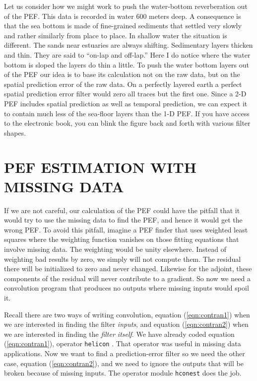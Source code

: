 
\par
Let us consider how we might work
to push the water-bottom reverberation out of the PEF.
This data is recorded in water 600 meters deep.
A consequence is that the sea bottom is made of fine-grained sediments
that settled very slowly and rather similarly from place to place.
In shallow water the situation is different.
The sands near estuaries are always shifting.
Sedimentary layers thicken and thin.
They are said to ``on-lap and off-lap.''
Here I do notice where the water bottom is sloped
the layers do thin a little.
To push the water bottom layers out of the PEF
our idea is to base its calculation not on the raw data,
but on the spatial prediction error of the raw data.
On a perfectly layered earth
a perfect spatial prediction error filter would zero all traces
but the first one.
Since a 2-D PEF includes spatial prediction as well as temporal
prediction, we can expect it to contain much less of the sea-floor
layers than the 1-D PEF.
If you have access to the electronic book, you can blink
the figure back and forth with various filter shapes.





\section{PEF ESTIMATION WITH MISSING DATA}
\par
If we are not careful,
our calculation of the PEF
could have the pitfall that it would try to use the missing
data to find the PEF, and hence it would get the wrong PEF.
To avoid this pitfall,
imagine a PEF finder that uses weighted least squares
where the weighting function vanishes on
those fitting equations that involve missing data.
The weighting would be unity elsewhere.
Instead of weighting bad results by zero,
we simply will not compute them.
The residual there will be initialized to zero and
never changed.
Likewise for the adjoint,
these components of the residual will never contribute to a gradient.
So now we need a convolution program that
produces no outputs where missing inputs would spoil it.

\par
Recall there are two ways of writing convolution,
equation (\ref{eqn:contran1})
when we are interested in finding the filter
{\em inputs}, and
equation (\ref{eqn:contran2})
when we are interested in finding the
{\em filter itself}.
We have already coded
equation (\ref{eqn:contran1}),
operator
\texttt{helicon} .
That operator was useful in missing data applications.
Now we want to find a prediction-error filter
so we need the other case,
equation (\ref{eqn:contran2}),
and we need to ignore the outputs
that will be broken because of missing inputs.
The operator module
\texttt{hconest} does the job.

